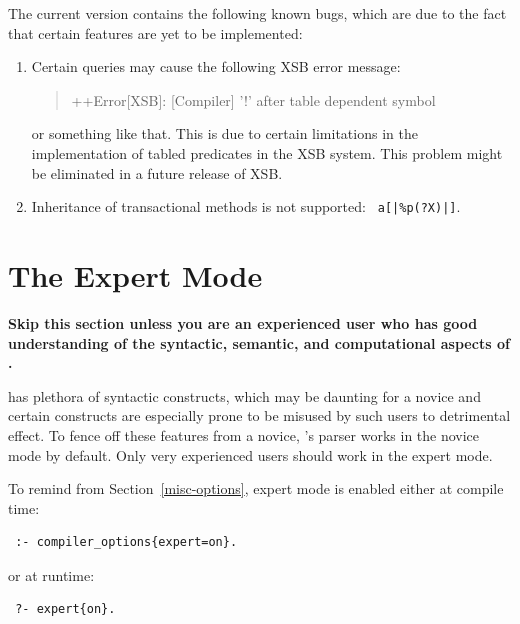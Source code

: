 \documentclass[11pt]{article}
\newcommand{\ERGO}{\mbox{\smaller{\ensuremath{\cal{E}}\smaller{{\sc{RGO}}}}}\xspace}
\newcommand{\FLSYSTEM}{\ERGO}
\begin{document}
The current version contains the following known bugs, which are due to the
fact that certain features are yet to be implemented:
\begin{enumerate}
  \item  Certain queries may cause the following XSB error message:
    \begin{quote}
     ++Error[XSB]: [Compiler] '!' after table dependent symbol 
    \end{quote}
    or something like that.
    This is due to certain limitations in the implementation of tabled
    predicates in the XSB system. This problem might be eliminated in a
    future release of XSB.
  \item Inheritance of transactional methods is not supported: {\tt
      a[|\%p(?X)|]}.
\end{enumerate}

\section{The Expert Mode}\label{sec-expert}

\textbf{Skip this section unless you are an experienced \FLSYSTEM user who
  has good understanding of the syntactic, semantic, and computational
  aspects of \FLSYSTEM.}

\FLSYSTEM has plethora of syntactic constructs, which may be daunting
for a novice and certain constructs are especially prone
to be misused by such users to detrimental effect.
To fence off these features from a novice, \FLSYSTEM's parser works in the
novice mode by default. Only very experienced users should work in the
expert mode.

To remind from Section~\ref{misc-options}, expert mode is enabled either at
compile time:
\begin{verbatim}
 :- compiler_options{expert=on}. 
\end{verbatim}
or at runtime:
\begin{verbatim}
 ?- expert{on}. 
\end{verbatim}
\end{document}
